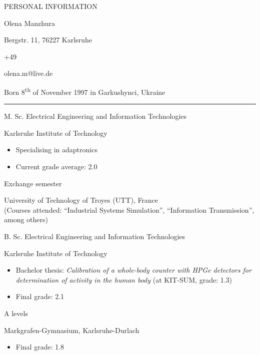 \documentclass[a4paper,10pt]{article}
\newlength{\cvcolumngapwidth}
\newlength{\cvleftcolumnwidth}
\newlength{\cvrightcolumnwidth}
\newcommand{\cvnamestyle}[1]{{\Large\textcolor{cvnamecolor}{#1}}}
\newcommand{\cvsectionstyle}[1]{{\normalsize\textcolor{cvsectioncolor}{#1}}}
\newcommand{\cvtitlestyle}[1]{{\large\textcolor{cvtitlecolor}{#1}}}
\newcommand{\cvdurationstyle}[1]{{\small\textcolor{cvdurationcolor}{#1}}}
\newlength{\cvafteritemskipamount}
\newlength{\cvaftersectionskipamount}
\newlength{\cvafternameskipamount}
\newlength{\cvafterpersonalinfolineskipamount}
\newlength{\cvaftertitleskipamount}
\newlength{\cvparskip}
\newcommand{\cvpersonalinfo}[2]{
    \begin{minipage}[t]{\cvleftcolumnwidth}
        \vspace{0mm} %
        \raggedleft #1
    \end{minipage}%
    \hspace{\cvcolumngapwidth}%
    \begin{minipage}[t]{\cvrightcolumnwidth}
        \vspace{0mm} %
        #2
    \end{minipage}

    \vspace{\cvafteritemskipamount}
}
\newcommand{\cvname}[1]{
    \cvnamestyle{#1}

    \vspace{\cvafternameskipamount}
}
\newcommand{\cvpersonalinfolinewithicon}[3]{
    \raisebox{.5\fontcharht\font`E-.5\height}{\texttt{[image: \#2]}}
    #3

    \vspace{\cvafterpersonalinfolineskipamount}
}
\newcommand{\cvsection}[1]{
    \begin{minipage}[t][][b]{\cvleftcolumnwidth}
        \raggedleft\cvsectionstyle{#1}
    \end{minipage}%
    \hspace{\cvcolumngapwidth}%
    \begin{minipage}[t]{\cvrightcolumnwidth}
        \textcolor{cvrulecolor}{\rule{\cvrightcolumnwidth}{0.3mm}}
    \end{minipage}

    \vspace{\cvaftersectionskipamount}
}
\newcommand{\cvitem}[2]{
    \begin{minipage}[t]{\cvleftcolumnwidth}
    \strut\vspace*{-\baselineskip}\newline %
    \raggedleft #1
    \end{minipage}%
    \hspace{\cvcolumngapwidth}%
    \begin{minipage}[t]{\cvrightcolumnwidth}
        \setlength{\parskip}{\cvparskip}
        \strut\vspace*{-\baselineskip}\newline #2 %
    \end{minipage}

    \vspace{\cvafteritemskipamount}
}
\newcommand{\cvtitle}[1]{
    \cvtitlestyle{#1}

    \vspace{\cvaftertitleskipamount}
    \vspace{-\cvparskip}
}
\begin{document}
\cvpersonalinfo{
    \cvsectionstyle{PERSONAL INFORMATION}
}{
    \cvname{Olena Manzhura}

    \cvpersonalinfolinewithicon{height=4mm}{resources/europasscv-icons/address_europass_icon.pdf}{
        Bergstr. 11, 76227 Karlsruhe
    }

    \cvpersonalinfolinewithicon{height=4mm}{resources/europasscv-icons/mobile_europass_icon.pdf}{
        +49\;176\;232\;041\;82
    }

    \cvpersonalinfolinewithicon{height=4mm}{resources/europasscv-icons/mail_europass_icon.pdf}{
        olena.m@live.de
    }


    Born 8\textsuperscript{th} of November 1997 in Garkushynci, Ukraine
}

\cvsection{EDUCATION}
\cvitem{\cvdurationstyle{2018 -- now}}{\cvtitle{M. Sc. Electrical Engineering and Information Technologies}
    Karlsruhe Institute of Technology
    \begin{itemize}[leftmargin=*]
        \item Specialising in adaptronics
        \item Current grade average: 2.0
    \end{itemize}
}

\cvitem{\cvdurationstyle{January 2020 -- June 2020}}{\cvtitle{Exchange semester}
	University of Technology of Troyes (UTT), France \\
	(Courses attended: ``Industrial Systems Simulation'', ``Information Transmission'', among others)
}

\cvitem{\cvdurationstyle{2015 -- 2018}}{\cvtitle{B. Sc. Electrical Engineering and Information Technologies}
	Karlsruhe Institute of Technology
	\begin{itemize}[leftmargin=*]
		\item Bachelor thesis: \textit{Calibration of a whole-body counter with HPGe detectors for determination of activity
in the human body} (at KIT-SUM, grade: 1.3)
		\item Final grade: 2.1
	\end{itemize}
}

\cvitem{\cvdurationstyle{2007 -- 2015}}{\cvtitle{A levels}
    Markgrafen-Gymnasium, Karlsruhe-Durlach
    \begin{itemize}[leftmargin=*]
        \item Final grade: 1.8
    \end{itemize}
}
\end{document}
